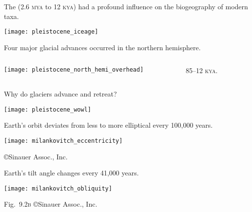 \documentclass[t]{beamer}
\begin{document}

\begin{frame}{The  (2.6 \textsc{mya} to 12 \textsc{kya}) had a profound influence on the biogeography of modern taxa.}
	\begin{center}
			\texttt{[image: pleistocene\_iceage]}
			
	\end{center}
\end{frame}

\begin{frame}{Four major glacial advances occurred in the northern hemisphere.}
	\begin{columns}[T]
		\begin{column}{0.45\textwidth}
			\texttt{[image: pleistocene\_north\_hemi\_overhead]}
		\end{column}
		\begin{column}{0.45\textwidth}
			\hangpara{}
			
			\hangpara{}
			
			\hangpara{}
			
			\hangpara{} 85–12 \textsc{kya}.
			
		\end{column}
	\end{columns}
\end{frame}


\begin{frame}{Why do glaciers advance and retreat?}
	\begin{center}
		\texttt{[image: pleistocene\_wowl]}
	\end{center}
\end{frame}

\begin{frame}{ Earth’s orbit deviates from less to more elliptical every 100,000 years.}
	\begin{center}
		\texttt{[image: milankovitch\_eccentricity]}
	\end{center}

	\vfilll
	
	\hfill \tiny \copyright Sinauer Assoc., Inc.
\end{frame}

\begin{frame}{ Earth’s tilt angle changes every 41,000 years.}

	{\centering
		\texttt{[image: milankovitch\_obliquity]}\par
	}

	\vfilll

	\hfill \tiny Fig.~9.2\textsc{b} \copyright Sinauer Assoc., Inc.

\end{frame}
\end{document}
